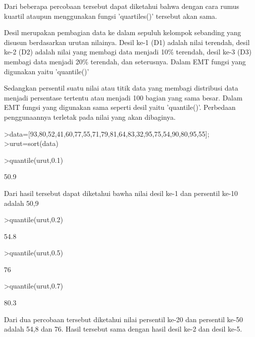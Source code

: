 \documentclass[a4paper,10pt]{article}
\begin{document}
\begin{eulernotebook}
\begin{eulercomment}
\begin{eulercomment}
\begin{eulercomment}
Dari beberapa percobaan tersebut dapat diketahui bahwa dengan cara
rumus kuartil ataupun menggunakan fungsi 'quartiles()' tersebut akan
sama.
\end{eulercomment}
\begin{eulercomment}
Desil merupakan pembagian data ke dalam sepuluh kelompok sebanding
yang disusun berdasarkan urutan nilainya. Desil ke-1 (D1) adalah nilai
terendah, desil ke-2 (D2) adalah nilai yang membagi data menjadi 10\%
terendah, desil ke-3 (D3) membagi data menjadi 20\% terendah, dan
seterusnya. Dalam EMT fungsi yang digunakan yaitu 'quantile()'


Sedangkan persentil suatu nilai atau titik data yang membagi
distribusi data menjadi persentase tertentu atau menjadi 100 bagian
yang sama besar. Dalam EMT fungsi yang digunakan sama seperti desil
yaitu 'quantile()'. Perbedaan penggunaannya terletak pada nilai yang
akan dibaginya.
\end{eulercomment}
\begin{eulerprompt}
>data=[93,80,52,41,60,77,55,71,79,81,64,83,32,95,75,54,90,80,95,55];
>urut=sort(data)
\end{eulerprompt}
\begin{euleroutput}
  [32,  41,  52,  54,  55,  55,  60,  64,  71,  75,  77,  79,  80,  80,
  81,  83,  90,  93,  95,  95]
\end{euleroutput}
\begin{eulerprompt}
>quantile(urut,0.1)
\end{eulerprompt}
\begin{euleroutput}
  50.9
\end{euleroutput}
\begin{eulercomment}
Dari hasil tersebut dapat diketahui bawha nilai desil ke-1 dan
persentil ke-10 adalah 50,9
\end{eulercomment}
\begin{eulerprompt}
>quantile(urut,0.2)
\end{eulerprompt}
\begin{euleroutput}
  54.8
\end{euleroutput}
\begin{eulerprompt}
>quantile(urut,0.5)
\end{eulerprompt}
\begin{euleroutput}
  76
\end{euleroutput}
\begin{eulerprompt}
>quantile(urut,0.7)
\end{eulerprompt}
\begin{euleroutput}
  80.3
\end{euleroutput}
\begin{eulercomment}
Dari dua percobaan tersebut diketahui nilai persentil ke-20 dan
persentil ke-50 adalah 54,8 dan 76. Hasil tersebut sama dengan hasil
desil ke-2 dan desil ke-5.


\end{eulercomment}
\end{eulercomment}
\end{eulercomment}
\end{eulernotebook}
\end{document}
